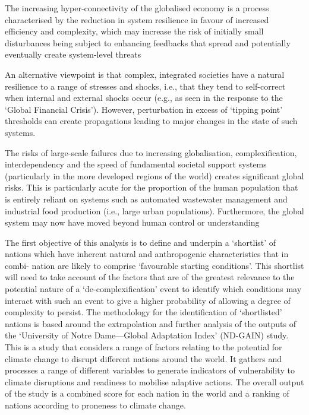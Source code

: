 \documentclass[
]{book}
\begin{document}
The increasing hyper-connectivity of the globalised economy
is a process characterised by the reduction in
system resilience in favour of increased efficiency and complexity, which may increase the
risk of initially small disturbances being subject to enhancing feedbacks that spread and
potentially eventually create system-level threats

An alternative
viewpoint is that complex, integrated societies have a natural resilience to a range of
stresses and shocks, i.e., that they tend to self-correct when internal and external shocks
occur (e.g., as seen in the response to the `Global Financial Crisis'). However, perturbation
in excess of `tipping point' thresholds can create propagations leading to major changes in
the state of such systems.

The risks of large-scale failures due to
increasing globalisation, complexification, interdependency and the speed of fundamental
societal support systems (particularly in the more developed regions of the world) creates
significant global risks. This is particularly acute for the proportion of the human
population that is entirely reliant on systems such as automated wastewater management and
industrial food production (i.e., large urban populations). Furthermore, the global system
may now have moved beyond human control or understanding

The first objective of this analysis is to define and underpin a `shortlist'
of nations which have inherent natural and anthropogenic characteristics that in combi-
nation are likely to comprise `favourable starting conditions'. This shortlist will need to
take account of the factors that are of the greatest relevance to the potential nature of a
`de-complexification' event to identify which conditions may interact with such an event to
give a higher probability of allowing a degree of complexity to persist.
The methodology for the identification of `shortlisted' nations is based around the
extrapolation and further analysis of the outputs of the `University of Notre Dame---Global
Adaptation Index' (ND-GAIN) study. This is a study that considers a range of factors
relating to the potential for climate change to disrupt different nations around the world. It
gathers and processes a range of different variables to generate indicators of vulnerability
to climate disruptions and readiness to mobilise adaptive actions. The overall output
of the study is a combined score for each nation in the world and a ranking of nations
according to proneness to climate change.
\end{document}
